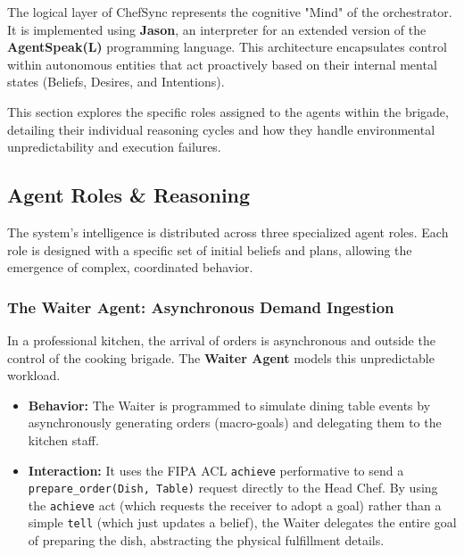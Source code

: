 \documentclass{scrartcl}
\begin{document}
The logical layer of ChefSync represents the cognitive "Mind" of the orchestrator. It is implemented using \textbf{Jason}, an interpreter for an extended version of the \textbf{AgentSpeak(L)} programming language. This architecture encapsulates control within autonomous entities that act proactively based on their internal mental states (Beliefs, Desires, and Intentions).

This section explores the specific roles assigned to the agents within the brigade, detailing their individual reasoning cycles and how they handle environmental unpredictability and execution failures.

\subsection{Agent Roles \& Reasoning}

The system's intelligence is distributed across three specialized agent roles. Each role is designed with a specific set of initial beliefs and plans, allowing the emergence of complex, coordinated behavior.

\subsubsection{The Waiter Agent: Asynchronous Demand Ingestion}
In a professional kitchen, the arrival of orders is asynchronous and outside the control of the cooking brigade. The \textbf{Waiter Agent} models this unpredictable workload.
\begin{itemize}
\item \textbf{Behavior:} The Waiter is programmed to simulate dining table events by asynchronously generating orders (macro-goals) and delegating them to the kitchen staff.
\item \textbf{Interaction:} It uses the FIPA ACL \texttt{achieve} performative to send a \texttt{prepare\_order(Dish, Table)} request directly to the Head Chef. By using the \texttt{achieve} act (which requests the receiver to adopt a goal) rather than a simple \texttt{tell} (which just updates a belief), the Waiter delegates the entire goal of preparing the dish, abstracting the physical fulfillment details.
\end{itemize}
\end{document}
